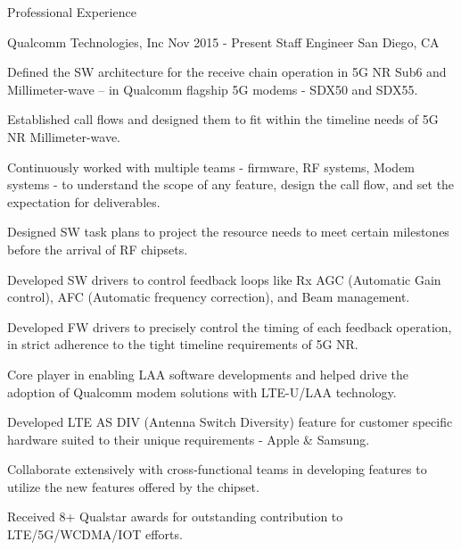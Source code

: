 \documentclass{resume}
\begin{document}
  \begin{rSection}{Professional Experience} 
    \begin{rSubsection}
    {Qualcomm Technologies, Inc}
    {Nov 2015 - Present}
    {Staff Engineer}
    {San Diego, CA}
    \item Defined the SW architecture for the receive chain operation in 5G NR 
    Sub6 and Millimeter-wave – in Qualcomm flagship 5G modems - SDX50 and SDX55.
    \item Established call flows and designed them to fit within the timeline 
    needs of 5G NR Millimeter-wave.
    \item Continuously worked with multiple teams - firmware, RF systems, 
    Modem systems - to understand the scope of any feature, design the call 
    flow, and set the expectation for deliverables.
    \item Designed SW task plans to project the resource needs to meet certain 
    milestones before the arrival of RF chipsets. 
    \item Developed SW drivers to control feedback loops like Rx AGC 
    (Automatic Gain control), AFC (Automatic frequency correction), and 
    Beam management.
    \item Developed FW drivers to precisely control the timing of each feedback 
    operation, in strict adherence to the tight timeline requirements of 5G NR.
    \item Core player in enabling LAA software developments and helped drive the 
    adoption of Qualcomm modem solutions with LTE-U/LAA technology.
    \item Developed LTE AS DIV (Antenna Switch Diversity) feature for customer 
    specific hardware suited to their unique requirements - Apple \& Samsung.
    \item Collaborate extensively with cross-functional teams in developing 
    features to utilize the new features offered by the chipset.
    \item Received 8+ Qualstar awards for outstanding contribution to 
    LTE/5G/WCDMA/IOT efforts.
    \end{rSubsection}
    

\end{rSection}
\end{document}
